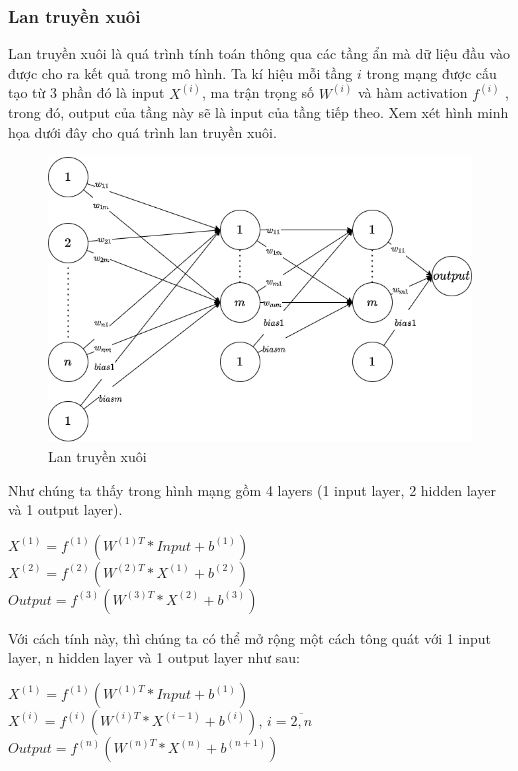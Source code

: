 \subsubsection{Lan truyền xuôi }
Lan truyền xuôi là quá trình tính toán thông qua các tầng ẩn mà dữ liệu đầu vào được cho ra kết quả trong mô hình. Ta kí hiệu mỗi tầng $i$ trong mạng được cấu tạo từ 3 phần đó là input $X^{(i)}$, ma trận trọng số $W^{(i)}$ và hàm activation $f^{(i)}$ , trong đó, output của tầng này sẽ là input của tầng tiếp theo. Xem xét hình minh họa dưới đây cho quá trình lan truyền xuôi.
\clearpage
\begin{figure}[!h]
	\centering
		\includegraphics[width=0.75\columnwidth]{chapter03/figure/ltx.png}
        \caption{Lan truyền xuôi}
        \label{fig:ltx}
		\centering
\end{figure}

Như chúng ta thấy trong hình mạng gồm 4 layers (1 input layer, 2 hidden layer và 1 output layer).
\begin{center}
    $X^{(1)} = f^{(1)}(W^{(1)T}*Input+b^{(1)})$\\
    $X^{(2)} = f^{(2)}(W^{(2)T}*X^{(1)}+b^{(2)})$\\
    $Output = f^{(3)}(W^{(3)T}*X^{(2)}+b^{(3)})$\\
\end{center}

Với cách tính này, thì chúng ta có thể mở rộng một cách tông quát với 1 input layer, n hidden layer và 1 output layer như sau:
\begin{center}
    $X^{(1)} = f^{(1)}(W^{(1)T}*Input+b^{(1)})$\\
    $X^{(i)} = f^{(i)}(W^{(i)T}*X^{(i-1)}+b^{(i)})$, $i=\overline{2,n}$\\
    $Output = f^{(n)}(W^{(n)T}*X^{(n)}+b^{(n+1)})$\\
\end{center}

